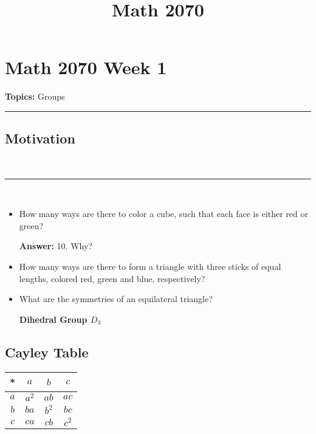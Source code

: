 \documentclass[a4paper,12pt]{report}
\newcounter{statement}
\numberwithin{statement}{chapter}
\numberwithin{equation}{chapter}
\numberwithin{section}{chapter}
\numberwithin{subsection}{section}
\begin{document}
\title{Math 2070}
\setcounter{chapter}{1}\setcounter{section}{0}
\setcounter{subsection}{0}
\setcounter{statement}{0}

\chapter*{Math 2070 Week 1}
{\bf Topics: }Groups
\hrule



\section{Motivation}


\quad\\\hrule
\quad\\

\begin{itemize}
\item 
How many ways are there to color a cube, such that each face is either red or green?




 {\bf Answer:} 
10. Why?




\item 
How many ways are there to form a triangle with three sticks of equal lengths, colored
red, green and blue, respectively?




\item 
What are the symmetries of an equilateral triangle?




\textbf{Dihedral Group $D_3$}










\end{itemize}




\section{Cayley Table}



\begin{center}
\begin{tabular}{|c|c|c|c|}
\hline
*&$a$&$b$&$c$ \\
\hline
$a$&$a^2$&$ab$&$ac$ \\
\hline
$b$&$ba$&$b^2$&$bc$ \\
\hline
$c$&$ca$&$cb$&$c^2$\\\hline
\end{tabular}
\end{center}
\end{document}
